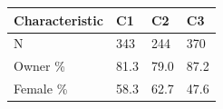 
\begin{tabular}[t]{llll}
\toprule
Characteristic & C1 & C2 & C3\\
\midrule
N & 343 & 244 & 370\\
Owner \% & 81.3 & 79.0 & 87.2\\
Female \% & 58.3 & 62.7 & 47.6\\
\bottomrule
\end{tabular}
